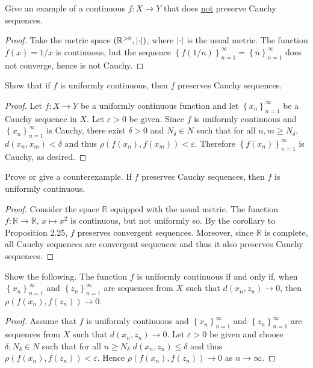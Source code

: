 \documentclass[12pt]{amsart}
\begin{document}
\begin{setup}
  \begin{ex}
    Give an example of a continuous $f \colon X \rightarrow Y$ that does \underline{not} preserve Cauchy sequences.
    \begin{proof}
      Take the metric space $(\mathbb{R}^{>0}, \left| \cdot \right|)$, where $\left| \cdot \right|$ is the usual metric.
      The function $f(x) = 1/x$ is continuous, but the sequence $\left\{f(1/n)\right\}_{n=1}^\infty = \left\{n\right\}_{n=1}^\infty$ does not converge, hence is not Cauchy.
    \end{proof}
  \end{ex}
  
  \begin{ex}
    Show that if $f$ is uniformly continuous, then $f$ preserves Cauchy sequences.
    \begin{proof}
      Let $f \colon X \rightarrow Y$ be a uniformly continuous function and let $\left\{x_n\right\}_{n=1}^\infty$ be a Cauchy sequence in $X$.
      Let $\varepsilon > 0$ be given.
      Since $f$ is uniformly continuous and $\left\{x_n\right\}_{n=1}^\infty$ is Cauchy, there exist $\delta > 0$ and $N_\delta \in N$ such that for all $n,m \geq N_\delta$, $d(x_n, x_m) < \delta$ and thus $\rho(f(x_n), f(x_m)) < \varepsilon$.
      Therefore $\left\{f(x_n)\right\}_{n=1}^\infty$ is Cauchy, as desired.
    \end{proof}
  \end{ex}
  
  \begin{ex}
    Prove or give a counterexample.
    If $f$ preserves Cauchy sequences, then $f$ is uniformly continuous.
    \begin{proof}
      Consider the space $\mathbb{R}$ equipped with the usual metric.
      The function $f \colon \mathbb{R} \rightarrow \mathbb{R}$, $x \mapsto x^2$ is continuous, but not uniformly so.
      By the corollary to Proposition 2.25, $f$ preserves convergent sequences.
      Moreover, since $\mathbb{R}$ is complete, all Cauchy sequences are convergent sequences and thus it also preserves Cauchy sequences.
    \end{proof}
  \end{ex}

  \begin{ex}
    Show the following.
    The function $f$ is uniformly continuous if and only if, when $\left\{x_n\right\}_{n=1}^\infty$ and $\left\{z_n\right\}_{n=1}^\infty$ are sequences from $X$ such that $d(x_n, z_n) \rightarrow 0$, then $\rho(f(x_n), f(z_n)) \rightarrow 0$.
    \begin{proof}
      Assume that $f$ is uniformly continuous and $\left\{x_n\right\}_{n=1}^\infty$ and $\left\{z_n\right\}_{n=1}^\infty$ are sequences from $X$ such that $d(x_n, z_n) \rightarrow 0$.
      Let $\varepsilon > 0$ be given and choose $\delta, N_\delta \in N$ such that for all $n \geq N_\delta$ $d(x_n, z_n) \leq \delta$ and thus $\rho(f(x_n), f(z_n)) < \varepsilon$.
      Hence $\rho(f(x_n), f(z_n)) \rightarrow 0$ as $n \rightarrow \infty$.
      

\end{proof}
\end{ex}
\end{setup}
\end{document}
